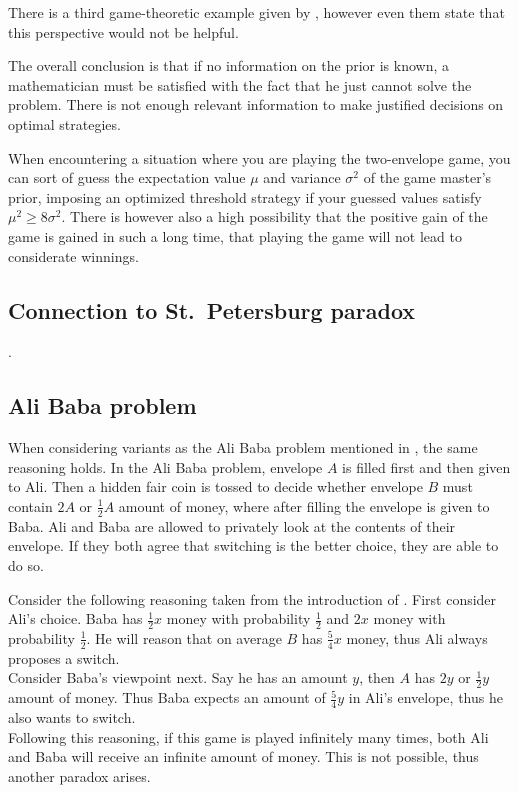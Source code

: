 \documentclass[twoside,a4paper]{article}
\theoremstyle{plain}
\theoremstyle{definition}
\theoremstyle{remark}
\numberwithin{equation}{section}
\DeclareMathOperator{\1}{\mathbbm{1}}
\begin{document}
There is a third game-theoretic example given by \cite{Albers05}, however even them state that this perspective would not be helpful.

The overall conclusion is that if no information on the prior is known, a mathematician must be satisfied with the fact that he just cannot solve the problem. There is not enough relevant information to make justified decisions on optimal strategies.

When encountering a situation where you are playing the two-envelope game, you can sort of guess the expectation value $\mu$ and variance $\sigma^2$ of the game master's prior, imposing an optimized threshold strategy if your guessed values satisfy $\mu^2\geq 8\sigma^2$. There is however also a high possibility that the positive gain of the game is gained in such a long time, that playing the game will not lead to considerate winnings.
\subsection{Connection to St.~Petersburg paradox}
\cite{Broome95,Tzur18,Brams95}.

\subsection{Ali Baba problem}
When considering variants as the Ali Baba problem mentioned in \cite{Nalebuff89}, the same reasoning holds. In the Ali Baba problem, envelope $A$ is filled first and then given to Ali. Then a hidden fair coin is tossed to decide whether envelope $B$ must contain $2A$ or $\frac{1}{2}A$ amount of money, where after filling the envelope is given to Baba. Ali and Baba are allowed to privately look at the contents of their envelope. If they both agree that switching is the better choice, they are able to do so.

Consider the following reasoning taken from the introduction of \cite{Nalebuff89}. First consider Ali's choice. Baba has $\frac{1}{2}x$ money with probability $\frac{1}{2}$ and $2x$ money with probability $\frac{1}{2}$. He will reason that on average $B$ has $\frac{5}{4}x$ money, thus Ali always proposes a switch.\\
Consider Baba's viewpoint next. Say he has an amount $y$, then $A$ has $2y$ or $\frac{1}{2}y$ amount of money. Thus Baba expects an amount of $\frac{5}{4}y$ in Ali's envelope, thus he also wants to switch.\\
Following this reasoning, if this game is played infinitely many times, both Ali and Baba will receive an infinite amount of money. This is not possible, thus another paradox arises.
\end{document}
